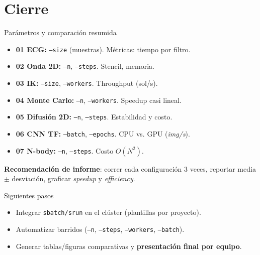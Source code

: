 \documentclass[aspectratio=169,professionalfonts]{beamer}
\begin{document}
\section{Cierre}

\begin{frame}{Parámetros y comparación resumida}
\small
\begin{itemize}
  \item \textbf{01 ECG:} \texttt{--size} (muestras). Métricas: tiempo por filtro.
  \item \textbf{02 Onda 2D:} \texttt{--n}, \texttt{--steps}. Stencil, memoria.
  \item \textbf{03 IK:} \texttt{--size}, \texttt{--workers}. Throughput (sol/s).
  \item \textbf{04 Monte Carlo:} \texttt{--n}, \texttt{--workers}. Speedup casi lineal.
  \item \textbf{05 Difusión 2D:} \texttt{--n}, \texttt{--steps}. Estabilidad y costo.
  \item \textbf{06 CNN TF:} \texttt{--batch}, \texttt{--epochs}. CPU vs. GPU (\emph{img/s}).
  \item \textbf{07 N-body:} \texttt{--n}, \texttt{--steps}. Costo \(O(N^2)\).
\end{itemize}
\vspace{1em}
\textbf{Recomendación de informe}: correr cada configuración 3 veces, reportar media \(\pm\) desviación, graficar \textit{speedup} y \textit{efficiency}.
\end{frame}

\begin{frame}{Siguientes pasos}
\begin{itemize}
  \item Integrar \texttt{sbatch/srun} en el clúster (plantillas por proyecto).
  \item Automatizar barridos (\texttt{--n}, \texttt{--steps}, \texttt{--workers}, \texttt{--batch}).
  \item Generar tablas/figuras comparativas y \textbf{presentación final por equipo}.
\end{itemize}
\end{frame}
\end{document}
